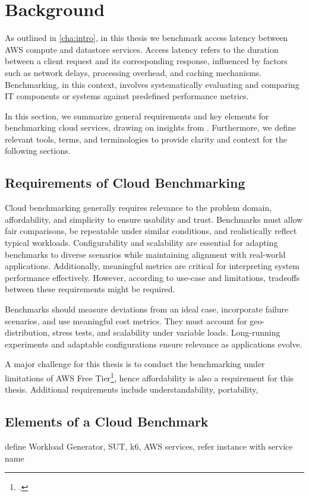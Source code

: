 \section{Background}
\label{cha:background}

As outlined in \cref{cha:intro}, in this thesis we benchmark access latency between AWS compute and datastore services. Access latency refers to the duration between a client request and its corresponding response, influenced by factors such as network delays, processing overhead, and caching mechanisms. Benchmarking, in this context, involves systematically evaluating and comparing IT components or systems against predefined performance metrics.

In this section, we summarize general requirements and key elements for benchmarking cloud services, drawing on insights from \cite{book_bermbach_cloud_service_benchmarking,paper_cooper_ycsb,paper_folkerts_benchmarking,paper_binnig_weather}. Furthermore, we define relevant tools, terms, and terminologies to provide clarity and context for the following sections.

\subsection{Requirements of Cloud Benchmarking}

Cloud benchmarking generally requires relevance to the problem domain, affordability, and simplicity to ensure usability and trust. Benchmarks must allow fair comparisons, be repeatable under similar conditions, and realistically reflect typical workloads. Configurability and scalability are essential for adapting benchmarks to diverse scenarios while maintaining alignment with real-world applications. Additionally, meaningful metrics are critical for interpreting system performance effectively. However, according to use-case and limitations, tradeoffs between these requirements might be required.

Benchmarks should measure deviations from an ideal case, incorporate failure scenarios, and use meaningful cost metrics. They must account for geo-distribution, stress tests, and scalability under variable loads. Long-running experiments and adaptable configurations ensure relevance as applications evolve.

A major challenge for this thesis is to conduct the benchmarking under limitations of AWS Free Tier\footcite{https://aws.amazon.com/free/}, hence affordability is also a requirement for this thesis. Additional requirements include understandability, portability, 

\subsection{Elements of a Cloud Benchmark}
define Workload Generator, SUT, k6, AWS services, refer instance with service name
